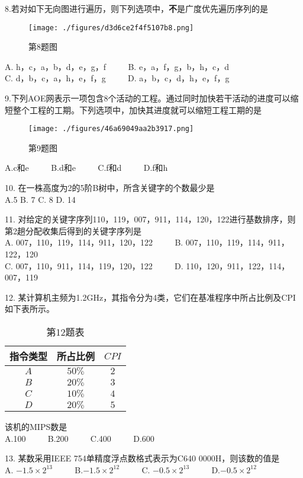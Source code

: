 8.若对如下无向图进行遍历，则下列选项中，\textbf{不}是广度优先遍历序列的是 \\
\begin{figure}[ht]
\centering
\texttt{[image: ./figures/d3d6ce2f4f5107b8.png]}
\caption{第8题图} \label{fig_CSN13_2}
\end{figure}
A. h，c，a，b，d，e，g，f $\qquad$ B. e，a，f，g，b，h，c，d \\
C. d，b，c，a，h，e，f，g $\qquad$ D. a，b，c，d，h，e，f，g 

9.下列AOE网表示一项包含8个活动的工程。通过同时加快若干活动的进度可以缩短整个工程的工期。下列选项中，加快其进度就可以缩短工程工期的是 \\
\begin{figure}[ht]
\centering
\texttt{[image: ./figures/46a69049aa2b3917.png]}
\caption{第9题图} \label{fig_CSN13_1}
\end{figure}
A.c和e  $\qquad$ B.d和e $\qquad$ C.f和d $\qquad$ D.f和h

10.	在一株高度为2的5阶B树中，所含关键字的个数最少是 \\
A.5                   B. 7                C. 8                D. 14 

11.	对给定的关键字序列110，119，007，911，114，120，122进行基数排序，则第2趟分配收集后得到的关键字序列是 \\
A. 007，110，119，114，911，120，122 $\qquad$ B. 007，110，119，114，911，122，120 \\
C. 007，110，911，114，119，120，122 $\qquad$ D. 110，120，911，122，114，007，119

12.	某计算机主频为1.2GHz，其指令分为4类，它们在基准程序中所占比例及CPI如下表所示。 \\
 \begin{table}[ht]
 \centering
 \caption{第12题表}\label{tab_CSN13_1}
 \begin{tabular}{|c|c|c|}
 \hline
 指令类型 & 所占比例 & $CPI$ \\
 \hline
 $A$ & $50\%$ & $2$ \\
 \hline
 $B$ & $20\%$ & $3$ \\
 \hline
 $C$ & $10\%$ & $4$ \\
 \hline
 $D$ & $20\%$ & $5$ \\
 \hline
 \end{tabular}
 \end{table}
该机的MIPS数是  \\
A.100 $\qquad$ B.200 $\qquad$ C.400 $\qquad$ D.600

13.	某数采用IEEE 754单精度浮点数格式表示为C640 0000H，则该数的值是 \\ 
A. $-1.5\times2^{13}$ $\qquad$ B.$-1.5\times2^{12}$ $\qquad$ C. $-0.5\times2^{13}$ $\qquad$ D.$-0.5\times2^{12}$

